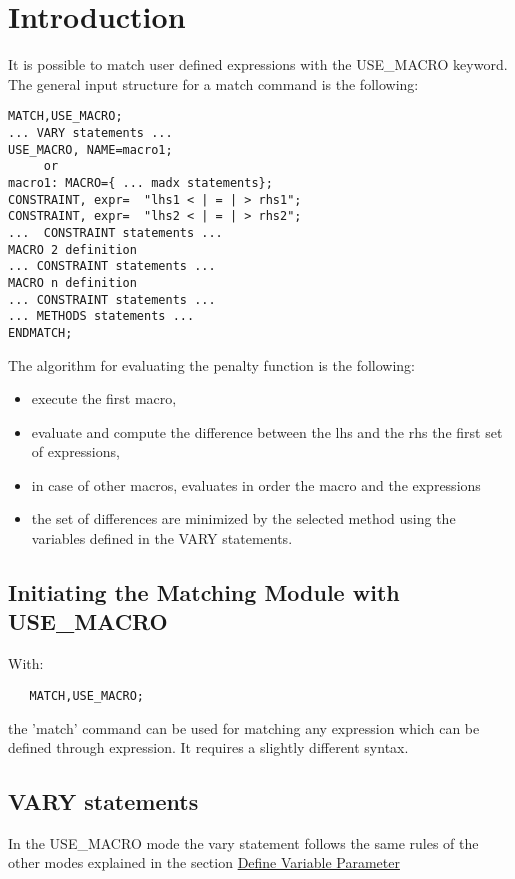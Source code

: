 
\section{ Introduction }
 
It is possible to match user defined expressions with the USE\_MACRO keyword.
The general input structure for a match command is the following:

\begin{verbatim}
MATCH,USE_MACRO;
... VARY statements ...
USE_MACRO, NAME=macro1;
     or
macro1: MACRO={ ... madx statements};
CONSTRAINT, expr=  "lhs1 < | = | > rhs1";
CONSTRAINT, expr=  "lhs2 < | = | > rhs2";
...  CONSTRAINT statements ...
MACRO 2 definition
... CONSTRAINT statements ...
MACRO n definition
... CONSTRAINT statements ...
... METHODS statements ...
ENDMATCH;
\end{verbatim}
 
The algorithm for evaluating the penalty function is the following:
 
\begin{itemize}
	\item  execute the first macro,
	\item  evaluate and compute the difference between the lhs and the rhs the first set of expressions,
	\item in case of other macros, evaluates in order the macro and the expressions
	\item  the set of differences are  minimized by the selected method using the variables defined in the VARY statements.
\end{itemize}

\subsection{Initiating the Matching Module with USE\_MACRO}
 
 With:
 
\begin{verbatim}
   MATCH,USE_MACRO;
\end{verbatim}

the 'match' command can be used for matching any expression which can be
defined through expression. It requires a slightly different syntax.

\subsection{VARY statements}
In the USE\_MACRO mode the vary statement follows the same rules of the other modes explained in the section \href{match_vary.html}{Define Variable Parameter}

